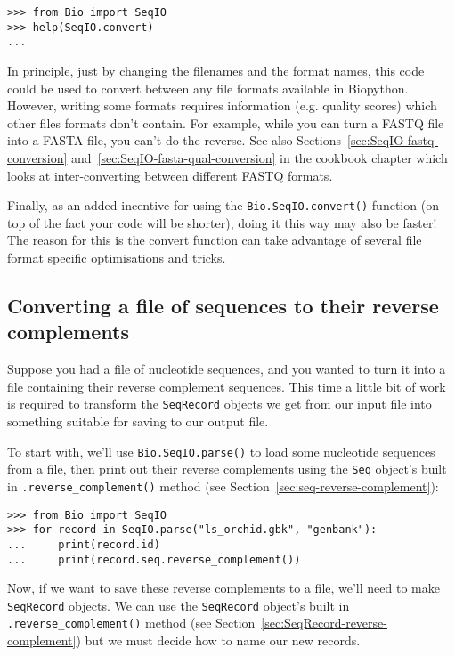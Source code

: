 \documentclass{report}
\begin{document}
\begin{verbatim}
>>> from Bio import SeqIO
>>> help(SeqIO.convert)
...
\end{verbatim}

In principle, just by changing the filenames and the format names, this code
could be used to convert between any file formats available in Biopython.
However, writing some formats requires information (e.g. quality scores) which
other files formats don't contain. For example, while you can turn a FASTQ
file into a FASTA file, you can't do the reverse. See also
Sections~\ref{sec:SeqIO-fastq-conversion} and~\ref{sec:SeqIO-fasta-qual-conversion}
in the cookbook chapter which looks at inter-converting between different FASTQ formats.

Finally, as an added incentive for using the \verb|Bio.SeqIO.convert()| function
(on top of the fact your code will be shorter), doing it this way may also be
faster! The reason for this is the convert function can take advantage of
several file format specific optimisations and tricks.

\subsection{Converting a file of sequences to their reverse complements}
\label{sec:SeqIO-reverse-complement}

Suppose you had a file of nucleotide sequences, and you wanted to turn it into a file containing their reverse complement sequences.  This time a little bit of work is required to transform the \verb|SeqRecord| objects we get from our input file into something suitable for saving to our output file.

To start with, we'll use \verb|Bio.SeqIO.parse()| to load some nucleotide
sequences from a file, then print out their reverse complements using
the \verb|Seq| object's built in \verb|.reverse_complement()| method (see Section~\ref{sec:seq-reverse-complement}):

\begin{verbatim}
>>> from Bio import SeqIO
>>> for record in SeqIO.parse("ls_orchid.gbk", "genbank"):
...     print(record.id)
...     print(record.seq.reverse_complement())
\end{verbatim}

Now, if we want to save these reverse complements to a file, we'll need to make \verb|SeqRecord| objects.
We can use  the \verb|SeqRecord| object's built in \verb|.reverse_complement()| method (see Section~\ref{sec:SeqRecord-reverse-complement}) but we must decide how to name our new records.
\end{document}
